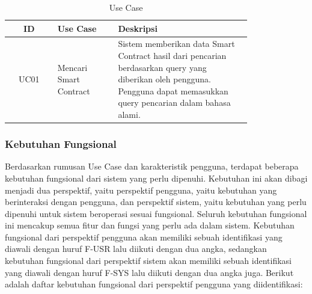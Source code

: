 \begin{table}[h]
	\caption{Use Case}
	\label{tabel:use-case}
	\vspace{0.25cm}
	\begin{center}
		\begin{tabular}{|c|p{0.25\linewidth}|p{0.55\linewidth}|}
			\hline
			\textbf{ID} & \textbf{Use Case}                  & \textbf{Deskripsi}                                                                                                                                                       \\ \hline
			UC01        & Mencari Smart Contract             & Sistem memberikan data Smart Contract hasil dari pencarian berdasarkan query yang diberikan oleh pengguna. Pengguna dapat memasukkan query pencarian dalam bahasa alami. \\ \hline
		\end{tabular}
	\end{center}
\end{table}

\subsubsection{Kebutuhan Fungsional}

Berdasarkan rumusan Use Case dan karakteristik pengguna, terdapat beberapa kebutuhan fungsional dari sistem yang perlu dipenuhi. Kebutuhan ini akan dibagi menjadi dua perspektif, yaitu perspektif pengguna, yaitu kebutuhan yang berinteraksi dengan pengguna, dan perspektif sistem, yaitu kebutuhan yang perlu dipenuhi untuk sistem beroperasi sesuai fungsional. Seluruh kebutuhan fungsional ini mencakup semua fitur dan fungsi yang perlu ada dalam sistem. Kebutuhan fungsional dari perspektif pengguna akan memiliki sebuah identifikasi yang diawali dengan huruf F-USR lalu diikuti dengan dua angka, sedangkan kebutuhan fungsional dari perspektif sistem akan memiliki sebuah identifikasi yang diawali dengan huruf F-SYS lalu diikuti dengan dua angka juga. Berikut adalah daftar kebutuhan fungsional dari perspektif pengguna yang diidentifikasi:

